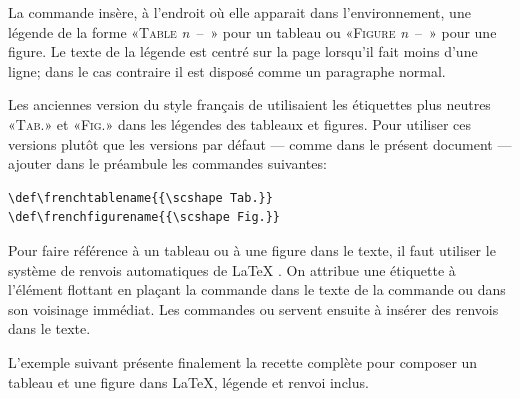 La commande \cmd{\caption} insère,  à l'endroit où elle
apparait dans l'environnement, une légende de la forme «\textsc{Table}
\emph{n}~--~» pour un tableau ou «\textsc{Figure}
\emph{n}~--~» pour une figure. Le texte de la légende est
centré sur la page lorsqu'il fait moins d'une ligne; dans le cas
contraire il est disposé comme un paragraphe normal.

\begin{conseil}
  Les anciennes version du style français de  utilisaient
  les étiquettes plus neutres «\textsc{Tab.}» et «\textsc{Fig.}» dans
  les légendes des tableaux et figures. Pour utiliser ces versions
  plutôt que les versions par défaut --- comme dans le présent
  document --- ajouter dans le préambule les commandes suivantes:
\begin{lstlisting}
\def\frenchtablename{{\scshape Tab.}}
\def\frenchfigurename{{\scshape Fig.}}
\end{lstlisting}
\end{conseil}

Pour faire référence à un tableau ou à une figure dans le texte, il
faut utiliser le système de renvois automatiques de {\LaTeX}
\citep[section~4]{UL:latex:1}. On attribue une étiquette à l'élément
flottant en plaçant la commande \cmd{\label} dans le texte de la
commande \cmd{\caption} ou dans son voisinage immédiat. Les commandes
\cmd{\ref} ou \cmd{\autoref} servent ensuite à insérer des renvois dans
le texte.

L'exemple suivant présente finalement la recette complète pour composer
un tableau et une figure dans {\LaTeX}, légende et renvoi inclus.

